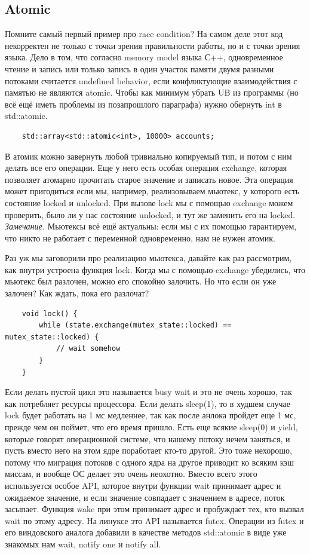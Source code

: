 \documentclass[12pt, a4paper]{article}
\begin{document}
\subsection{Atomic}
Помните самый первый пример про race condition? На самом деле этот код некорректен не только с точки зрения правильности работы, но и с точки зрения языка. Дело в том, что согласно memory model языка С++, одновременное чтение и запись или только запись в один участок памяти двумя разными потоками считается undefined behavior, если конфликтующие взаимодействия с памятью не являются atomic. Чтобы как минимум убрать UB из программы (но всё ещё иметь проблемы из позапрошлого параграфа) нужно обернуть int в std::atomic.
\begin{verbatim}
	std::array<std::atomic<int>, 10000> accounts;
\end{verbatim}
В атомик можно завернуть любой тривиально копируемый тип, и потом с ним делать все его операции. Еще у него есть особая операция exchange, которая позволяет атомарно прочитать старое значение и записать новое. Эта операция может пригодиться если мы, например, реализовываем мьютекс, у которого есть состояние locked и unlocked. При вызове lock мы с помощью exchange можем проверить, было ли у нас состояние unlocked, и тут же заменить его на locked.\\
\textit{Замечание.} Мьютексы всё ещё актуальны: если мы с их помощью гарантируем, что никто не работает с переменной одновременно, нам не нужен атомик.
\par Раз уж мы заговорили про реализацию мьютекса, давайте как раз рассмотрим, как внутри устроена функция lock. Когда мы с помощью exchange убедились, что мьютекс был разлочен, можно его спокойно залочить. Но что если он уже залочен? Как ждать, пока его разлочат?
\begin{verbatim}
	void lock() {
		while (state.exchange(mutex_state::locked) == mutex_state::locked) {
			// wait somehow
		}
	}
\end{verbatim}
Если делать пустой цикл это называется busy wait и это не очень хорошо, так как потребляет ресурсы процессора. Если делать sleep(1), то в худшем случае lock будет работать на 1 мс медленнее, так как после анлока пройдет еще 1 мс, прежде чем он поймет, что его время пришло. Есть еще всякие sleep(0) и yield, которые говорят операционной системе, что нашему потоку нечем заняться, и пусть вместо него на этом ядре поработает кто-то другой. Это тоже нехорошо, потому что миграция потоков с одного ядра на другое приводит ко всяким кэш миссам, и вообще ОС делает это очень неохотно. Вместо всего этого используется особое API, которое внутри функции wait принимает адрес и ожидаемое значение, и если значение совпадает с значением в адресе, поток засыпает. Функция wake при этом принимает адрес и пробуждает тех, кто вызвал wait по этому адресу. На линуксе это API называется futex. Операции из futex и его виндовского аналога добавили в качестве методов std::atomic в виде уже знакомых нам wait, notify one и notify all.\\
\end{document}
